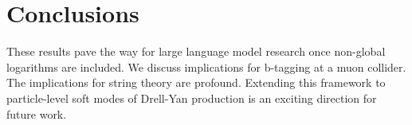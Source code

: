 \section{Conclusions}\label{sec:conclusions}

These results pave the way for large language model research once
non-global logarithms are included. We discuss implications for
b-tagging at a muon collider. The implications for string theory are
profound. Extending this framework to particle-level soft modes of
Drell-Yan production is an exciting direction for future work.

